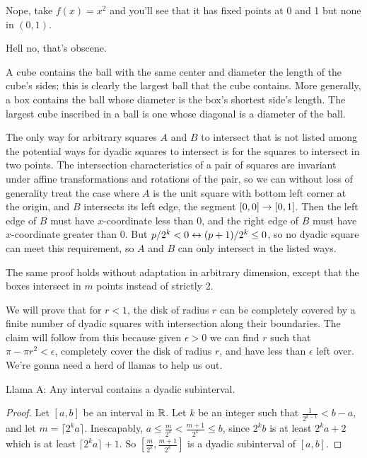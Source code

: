 \documentclass[11pt, oneside]{article}   	%
\begin{document}
\item Nope, take $f(x) = x^2$ and you'll see that it has fixed points at 0 and 1 but none in $(0, 1)$. 
\item Hell no, that's obscene.
\ee
\item A cube contains the ball with the same center and diameter the length of the cube's sides; this is clearly the largest ball that the cube contains. More generally, a box contains the ball whose diameter is the box's shortest side's length. The largest cube inscribed in a ball is one whose diagonal is a diameter of the ball.
\item \be
\item The only way for arbitrary squares $A$ and $B$ to intersect that is not listed among the potential ways for dyadic squares to intersect is for the squares to intersect in two points. The intersection characteristics of a pair of squares are invariant under affine transformations and rotations of the pair, so we can without loss of generality treat the case where $A$ is the unit square with bottom left corner at the origin, and $B$ intersects its left edge, the segment $[0, 0] \rightarrow [0, 1]$. Then the left edge of $B$ must have $x$-coordinate less than 0, and the right edge of $B$ must have $x$-coordinate greater than 0. But $p/2^k < 0 \leftrightarrow (p+1)/2^k \le 0$, so no dyadic square can meet this requirement, so $A$ and $B$ can only intersect in the listed ways.
\item The same proof holds without adaptation in arbitrary dimension, except that the boxes intersect in $m$ points instead of strictly 2.
\ee
\item \be
\item We will prove that for $r < 1$, the disk of radius $r$ can be completely covered by a finite number of dyadic squares with intersection along their boundaries. The claim will follow from this because given $\epsilon > 0$ we can find $r$ such that $\pi - \pi r^2 < \epsilon$, completely cover the disk of radius $r$, and have less than $\epsilon$ left over. We're gonna need a herd of llamas to help us out.

Llama A: Any interval contains a dyadic subinterval.
\begin{proof}
Let $[a, b]$ be an interval in $\mathbb{R}$. Let $k$ be an integer such that $\frac{1}{2^{k-1}} < b-a$, and let $m = \lceil 2^ka \rceil$. Inescapably, $a \le \frac{m}{2^k} < \frac{m+1}{2^k} \le b$, since $2^kb$ is at least $2^ka + 2$ which is at least $\lceil 2^ka \rceil + 1$. So $[\frac{m}{2^k}, \frac{m+1}{2^k}]$ is a dyadic subinterval of $[a, b]$.
\end{proof}
\end{document}
